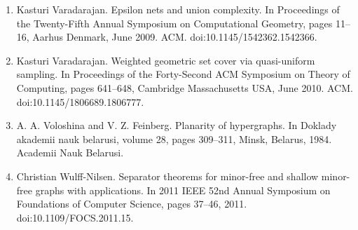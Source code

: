 \documentclass[10pt,a4paper]{article}
\begin{document}
\begin{enumerate}
\item[]  [62]  Kasturi Varadarajan.  Epsilon nets and union complexity.  In Proceedings of the Twenty-Fifth Annual Symposium on Computational Geometry, pages 11–16, Aarhus Denmark, June 2009. ACM.  doi:10.1145/1542362.1542366.  
\item[]  [63]  Kasturi Varadarajan.  Weighted geometric set cover via quasi-uniform sampling.  In Proceedings of the Forty-Second ACM Symposium on Theory of Computing, pages 641–648, Cambridge Massachusetts USA, June 2010. ACM.  doi:10.1145/1806689.1806777.  
\item[]  [64]  A. A. Voloshina and V. Z. Feinberg.  Planarity of hypergraphs.  In Doklady akademii nauk belarusi, volume 28, pages 309–311, Minsk, Belarus, 1984. Academii Nauk Belarusi.  
\item[]  [65]  Christian Wulff-Nilsen.  Separator theorems for minor-free and shallow minor-free graphs with applications.  In 2011 IEEE 52nd Annual Symposium on Foundations of Computer Science, pages 37–46, 2011.  doi:10.1109/FOCS.2011.15.  
\end{enumerate}
\end{document}
